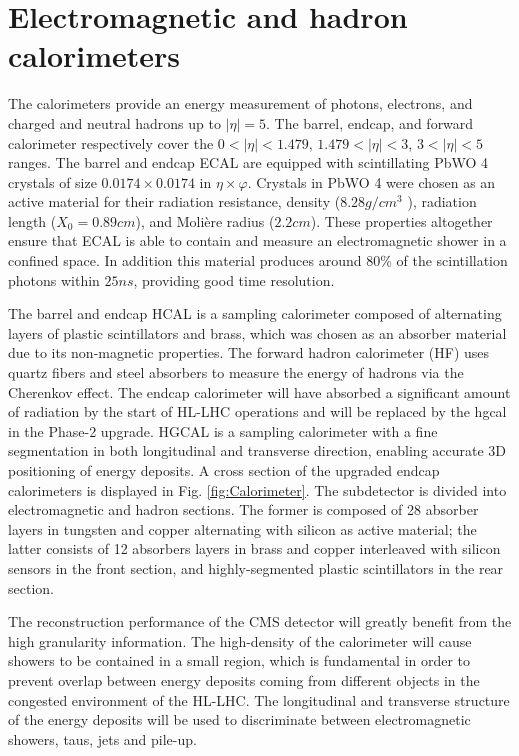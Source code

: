 \documentclass[../../main.tex]{subfiles}
\begin{document}
\section{Electromagnetic and hadron calorimeters}
\label{sec:Calo}

The calorimeters provide an energy measurement of photons, electrons, and charged and neutral hadrons up to $|\eta| = 5$. The barrel, endcap, and forward calorimeter respectively cover the $0 < | \eta | < 1.479$, $1.479 < | \eta | < 3$, $3 < | \eta | < 5$ ranges.  
The barrel and endcap ECAL \cite{ECAL} are equipped with scintillating PbWO 4 crystals of size $0.0174 \times 0.0174$ in $\eta \times \varphi$. Crystals in PbWO 4 were chosen as an active material for their radiation resistance, density ($8.28 g/cm^3$ ), radiation length ($X_0 = 0.89 cm$), and Molière radius ($2.2 cm$). These properties altogether ensure that ECAL is able to contain and measure an electromagnetic shower in a confined space. In addition this material produces around 80\% of the scintillation photons within $25 ns$, providing good time resolution.  

The barrel and endcap HCAL \cite{HCAL} is a sampling calorimeter composed of alternating layers of plastic scintillators and brass, which was chosen as an absorber material due to its non-magnetic
properties. The forward hadron calorimeter (HF) uses quartz fibers and steel absorbers to measure the energy of hadrons via the Cherenkov effect.
The endcap calorimeter will have absorbed a significant amount of radiation by the start of HL-LHC operations and will be replaced by the \acrfull{hgcal} \cite{HGCAL} in the Phase-2 upgrade. HGCAL is a sampling calorimeter with a fine segmentation in both longitudinal and transverse direction, enabling accurate 3D positioning of energy deposits. A
cross section of the upgraded endcap calorimeters is displayed in Fig. \ref{fig:Calorimeter}. The subdetector is divided into electromagnetic and hadron sections. The former is composed of 28 absorber layers
in tungsten and copper alternating with silicon as active material; the latter consists of 12 absorbers layers in brass and copper interleaved with silicon sensors in the front section, and
highly-segmented plastic scintillators in the rear section.  

The reconstruction performance of the CMS detector will greatly benefit from the high granularity information. The high-density of the calorimeter will cause showers to be contained in a small region, which is fundamental in order to prevent overlap between energy deposits coming from different objects in the congested environment of the HL-LHC. The longitudinal and transverse
structure of the energy deposits will be used to discriminate between electromagnetic showers, taus, jets and pile-up. 
\end{document}
